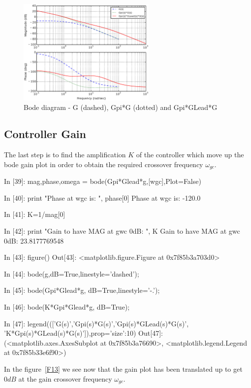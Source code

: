 \begin{figure}[htbp]	%
\centering
\includegraphics[width=0.6\textwidth]{eps/bodeplantpilead.eps}
\caption{Bode diagram - G (dashed), Gpi*G (dotted) and Gpi*GLead*G}
\label{F12}
\end{figure}

\subsection{Controller Gain}

The last step is to find the amplification $K$ of the controller which move up 
the bode gain plot in order to obtain the required crossover frequency 
$\omega_{gc}$.

\begin{code}
In [39]: mag,phase,omega = bode(Gpi*Glead*g,[wgc],Plot=False)

In [40]: print "Phase at wgc is: ", phase[0]
Phase at wgc is:  -120.0

In [41]: K=1/mag[0]

In [42]: print "Gain to have MAG at gwc 0dB: ", K
Gain to have MAG at gwc 0dB:  23.8177769548

In [43]: figure()
Out[43]: <matplotlib.figure.Figure at 0x7f85b3a703d0>

In [44]: bode(g,dB=True,linestyle='dashed');

In [45]: bode(Gpi*Glead*g, dB=True,linestyle='-.');

In [46]: bode(K*Gpi*Glead*g, dB=True);

In [47]: 
legend((['G(s)','Gpi(s)*G(s)','Gpi(s)*GLead(s)*G(s)',
'K*Gpi(s)*GLead(s)*G(s)']),prop={'size':10})
Out[47]: 
(<matplotlib.axes.AxesSubplot at 0x7f85b3a76690>,
 <matplotlib.legend.Legend at 0x7f85b33e6f90>)
\end{code}

In the figure~\ref{F13} we see now that the gain plot has been translated up to 
get $0dB$ at the gain crossover frequency $\omega_{gc}$.

